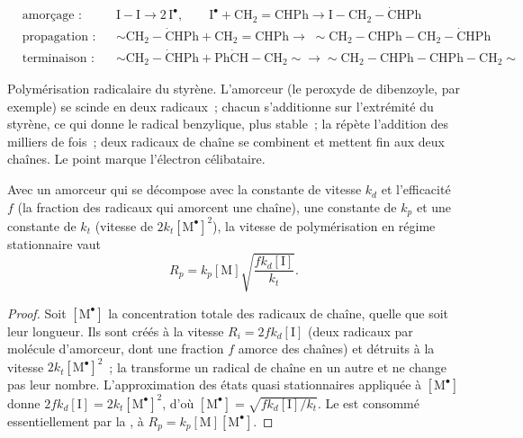 \begin{omfigure}
\begin{align*}
&\text{amorçage~:} && \mathrm{I{-}I} \longrightarrow 2\,\mathrm{I^{\bullet}}, \qquad
\mathrm{I^{\bullet} + CH_2{=}CHPh \longrightarrow I{-}CH_2{-}\dot{C}HPh} \\
&\text{propagation~:} && {\sim}\mathrm{CH_2{-}\dot{C}HPh + CH_2{=}CHPh \longrightarrow}\;
{\sim}\mathrm{CH_2{-}CHPh{-}CH_2{-}\dot{C}HPh} \\
&\text{terminaison~:} && {\sim}\mathrm{CH_2{-}\dot{C}HPh + Ph\dot{C}H{-}CH_2}{\sim} \longrightarrow
{\sim}\mathrm{CH_2{-}CHPh{-}CHPh{-}CH_2}{\sim}
\end{align*}

{\small Polymérisation radicalaire du styrène. L'amorceur  (le peroxyde de dibenzoyle, par
exemple) se scinde en deux radicaux~; chacun s'additionne sur l'extrémité  du styrène, ce qui donne
le radical benzylique, plus stable~; la  répète l'addition des milliers de fois~; deux radicaux
de chaîne se combinent et mettent fin aux deux chaînes. Le point marque l'électron célibataire.}
\end{omfigure}

\begin{theorem}\label{thm:b2:polymer-synthesis:radical-rate}
Avec un amorceur qui se décompose avec la constante de vitesse $k_d$ et l'efficacité $f$ (la fraction
des radicaux qui amorcent une chaîne), une constante de  $k_p$ et une constante de 
$k_t$ (vitesse de  $2k_t
[\mathrm{M^\bullet}]^2$), la vitesse de polymérisation en régime stationnaire vaut
\begin{equation*}
R_p = k_p [\mathrm M] \sqrt{\frac{f k_d [\mathrm I]}{k_t}}.
\end{equation*}
\end{theorem}

\begin{proof}
Soit $[\mathrm{M^\bullet}]$ la concentration totale des radicaux de chaîne, quelle que soit leur longueur.
Ils sont créés à la vitesse $R_i = 2fk_d[\mathrm I]$ (deux radicaux par molécule d'amorceur, dont une
fraction $f$ amorce des chaînes) et détruits à la vitesse $2k_t[\mathrm{M^\bullet}]^2$~; la 
transforme un radical de chaîne en un autre et ne change pas leur nombre. L'approximation des états quasi
stationnaires appliquée à
$[\mathrm{M^\bullet}]$ donne $2fk_d[\mathrm I] = 2k_t[\mathrm{M^\bullet}]^2$, d'où $[\mathrm{M^\bullet}] =
\sqrt{fk_d[\mathrm I]/k_t}$. Le  est consommé essentiellement par la , à $R_p =
k_p[\mathrm M][\mathrm{M^\bullet}]$.
\end{proof}

